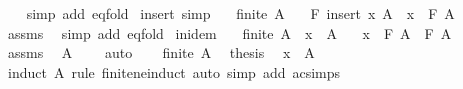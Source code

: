 \begin{isabellebody}
%
\isadelimproof
\ \ %
\endisadelimproof
%
\isatagproof
{}\isamarkupfalse%
\ {\isacharparenleft}{\kern0pt}simp\ add{\isacharcolon}{\kern0pt}\ eq{\isacharunderscore}{\kern0pt}fold{\isacharparenright}{\kern0pt}%
\endisatagproof
{\isafoldproof}%
%
\isadelimproof
\isanewline
%
\endisadelimproof
\isanewline
{}\isamarkupfalse%
\ insert\ {\isacharbrackleft}{\kern0pt}simp{\isacharbrackright}{\kern0pt}{\isacharcolon}{\kern0pt}\isanewline
\ \ \ {\isachardoublequoteopen}finite\ A{\isachardoublequoteclose}\isanewline
\ \ \ {\isachardoublequoteopen}F\ {\isacharparenleft}{\kern0pt}insert\ x\ A{\isacharparenright}{\kern0pt}\ {\isacharequal}{\kern0pt}\ x\ \isactrlbold {\isacharasterisk}{\kern0pt}\ F\ A{\isachardoublequoteclose}\isanewline
%
\isadelimproof
\ \ %
\endisadelimproof
%
\isatagproof
{}\isamarkupfalse%
\ assms\ \isamarkupfalse%
\ {\isacharparenleft}{\kern0pt}simp\ add{\isacharcolon}{\kern0pt}\ eq{\isacharunderscore}{\kern0pt}fold{\isacharparenright}{\kern0pt}%
\endisatagproof
{\isafoldproof}%
%
\isadelimproof
\isanewline
%
\endisadelimproof
\isanewline
{}\isamarkupfalse%
\ in{\isacharunderscore}{\kern0pt}idem{\isacharcolon}{\kern0pt}\isanewline
\ \ \ {\isachardoublequoteopen}finite\ A{\isachardoublequoteclose}\ \ {\isachardoublequoteopen}x\ {\isasymin}\ A{\isachardoublequoteclose}\isanewline
\ \ \ {\isachardoublequoteopen}x\ \isactrlbold {\isacharasterisk}{\kern0pt}\ F\ A\ {\isacharequal}{\kern0pt}\ F\ A{\isachardoublequoteclose}\isanewline
%
\isadelimproof
%
\endisadelimproof
%
\isatagproof
{}\isamarkupfalse%
\ {\isacharminus}{\kern0pt}\isanewline
\ \ \isamarkupfalse%
\ assms\ \isamarkupfalse%
\ {\isachardoublequoteopen}A\ {\isasymnoteq}\ {\isacharbraceleft}{\kern0pt}{\isacharbraceright}{\kern0pt}{\isachardoublequoteclose}\ \isamarkupfalse%
\ auto\isanewline
\ \ \isamarkupfalse%
\ {\isacartoucheopen}finite\ A{\isacartoucheclose}\ \isamarkupfalse%
\ {\isacharquery}{\kern0pt}thesis\ \isamarkupfalse%
\ {\isacartoucheopen}x\ {\isasymin}\ A{\isacartoucheclose}\isanewline
\ \ \ \ \isamarkupfalse%
\ {\isacharparenleft}{\kern0pt}induct\ A\ rule{\isacharcolon}{\kern0pt}\ finite{\isacharunderscore}{\kern0pt}ne{\isacharunderscore}{\kern0pt}induct{\isacharparenright}{\kern0pt}\ {\isacharparenleft}{\kern0pt}auto\ simp\ add{\isacharcolon}{\kern0pt}\ ac{\isacharunderscore}{\kern0pt}simps{\isacharparenright}{\kern0pt}\isanewline

\end{isabellebody}
